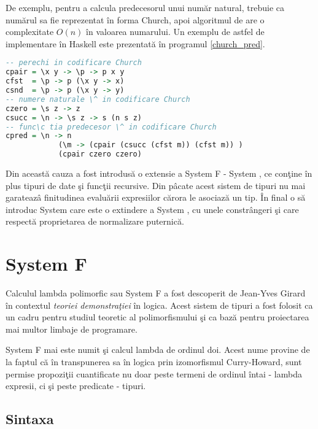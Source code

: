 \begin{example}
De exemplu, pentru a calcula predecesorul unui num\u ar natural, trebuie ca nu\-m\u a\-rul sa fie reprezentat \^ in forma Church, apoi algoritmul de are o complexitate $O(n)$ \^ in valoarea numarului. Un exemplu de astfel de implementare \^ in Haskell este prezentat\u a \^ in programul \ref{church_pred}.
\done{}
\end{example}

\begin{lstlisting}[label=church_pred,captionpos=b,caption=Func\c tia predecesor \^ in codificare Church,language=Haskell,float=tb]
-- perechi in codificare Church
cpair = \x y -> \p -> p x y
cfst  = \p -> p (\x y -> x)
csnd  = \p -> p (\x y -> y)
-- numere naturale \^ in codificare Church
czero = \s z -> z
csucc = \n -> \s z -> s (n s z)
-- func\c tia predecesor \^ in codificare Church
cpred = \n -> n
            (\m -> (cpair (csucc (cfst m)) (cfst m)) )
            (cpair czero czero)
\end{lstlisting}

Din aceast\u a cauza a fost introdus\u a o extensie a System F - System \frec, ce con\c tine \^ in plus tipuri de date \c si func\c tii recursive. Din p\^ acate acest sistem de tipuri nu mai garateaz\^ a finitudinea evalu\u arii expresiilor c\u arora le asociaz\u a un tip. \^In final o s\u a introduc System \fhat care este o extindere a System \frec, cu unele constr\^ angeri \c si care respect\u a proprietarea de normalizare puternic\u a.

\section{System F}

Calculul lambda polimorfic sau System F a fost descoperit de Jean-Yves Girard \citep{64805} \^ in contextul \emph{teoriei demonstra\c tiei} \^ in logica. Acest sistem de tipuri a fost folosit ca un cadru pentru studiul teoretic al polimorfismului \c si ca baz\u a pentru proiectarea mai multor limbaje de programare.

System F mai este numit \c si calcul lambda de ordinul doi. Acest nume provine de la faptul c\u a \^ in transpunerea sa \^ in logica prin izomorfismul Curry-Howard, sunt permise propozi\c tii cuantificate nu doar peste termeni de ordinul \^ intai - lambda expresii, ci \c si peste predicate - tipuri.

\subsection{Sintaxa}

